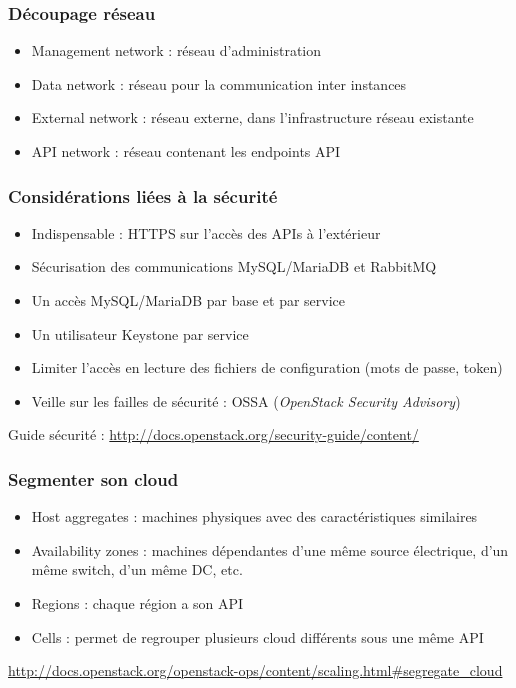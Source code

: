   \begin{frame}
  \frametitle{Découpage réseau}
    \begin{itemize}
      \item Management network : réseau d'administration
      \item Data network : réseau pour la communication inter instances
      \item External network : réseau externe, dans l'infrastructure réseau existante
      \item API network : réseau contenant les endpoints API
    \end{itemize}
  \end{frame}

  \begin{frame}
    \frametitle{Considérations liées à la sécurité}
    \begin{itemize}
      \item Indispensable : HTTPS sur l'accès des APIs à l'extérieur
      \item Sécurisation des communications MySQL/MariaDB et RabbitMQ
      \item Un accès MySQL/MariaDB par base et par service
      \item Un utilisateur Keystone par service
      \item Limiter l'accès en lecture des fichiers de configuration (mots de passe, token)
      \item Veille sur les failles de sécurité : OSSA (\textit{OpenStack Security Advisory})
    \end{itemize}
    Guide sécurité : \url{http://docs.openstack.org/security-guide/content/}
  \end{frame}

  \begin{frame}
    \frametitle{Segmenter son cloud}
    \begin{itemize}
      \item Host aggregates : machines physiques avec des caractéristiques similaires
      \item Availability zones : machines dépendantes d'une même source électrique, d'un même switch, d'un même DC, etc.
      \item Regions : chaque région a son API
      \item Cells : permet de regrouper plusieurs cloud différents sous une même API
    \end{itemize}
    \url{http://docs.openstack.org/openstack-ops/content/scaling.html\#segregate\_cloud}
  \end{frame}


